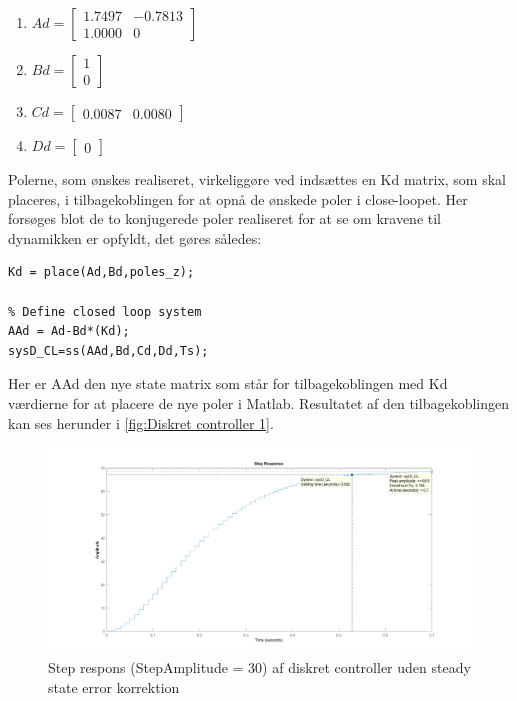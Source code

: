 \begin{enumerate}
	
	\item
	$
	Ad = 
	\begin{bmatrix}
	
	1.7497  & -0.7813\\
	1.0000   &      0
	\end{bmatrix}
	$
	\item
	$
	Bd = 
	\begin{bmatrix}
	
	1\\
	0
	\end{bmatrix}
	$    
	
	\item 
	$
	Cd = 
	\begin{bmatrix}
	
	0.0087  &  0.0080
	\end{bmatrix}
	$    
	\item
	$
	Dd = 
	\begin{bmatrix}
	
	0  
	\end{bmatrix}
	$  
\end{enumerate}      
Polerne, som ønskes realiseret, virkeliggøre ved indsættes en Kd matrix, som skal placeres, i tilbagekoblingen for at opnå de ønskede poler i close-loopet. Her forsøges blot de to konjugerede poler realiseret for at se om kravene til dynamikken er opfyldt, det gøres således:

\begin{lstlisting}[frame=single]
Kd = place(Ad,Bd,poles_z);

% Define closed loop system
AAd = Ad-Bd*(Kd);
sysD_CL=ss(AAd,Bd,Cd,Dd,Ts);
\end{lstlisting}
Her er AAd den nye state matrix som står for tilbagekoblingen med Kd værdierne for at placere de nye poler i Matlab. Resultatet af den tilbagekoblingen kan ses herunder i \autoref{fig:Diskret controller 1}. 

\begin{figure}[H]
	\centering
	\includegraphics[width = 1\textwidth]{figur/Step_diskret_1}
	\caption{Step respons (StepAmplitude = 30) af diskret controller uden steady state error korrektion}
	\label{fig:Diskret controller 1}
\end{figure}




